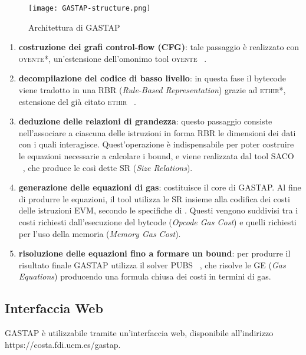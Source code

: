     \begin{figure}[h]
        \centering
        \texttt{[image: GASTAP-structure.png]}
        \caption[Struttura interna di GASTAP]{Architettura di GASTAP}
        \label{fig:gstp-struct}
    \end{figure}
    
    \begin{enumerate}
        \item \textbf{costruzione dei grafi control-flow (CFG)}: tale passaggio è realizzato con \textsc{oyente*}, un'estensione dell'omonimo tool \textsc{oyente} ~\cite{melonproject/oyente}.
        \item \textbf{decompilazione del codice di basso livello}: in questa fase il bytecode viene tradotto in una RBR (\textit{Rule-Based Representation}) grazie ad \textsc{ethir*}, estensione del già citato \textsc{ethir} ~\cite{albert2018ethir}.
        \item \textbf{deduzione delle relazioni di grandezza}: questo passaggio consiste nell'associare a ciascuna delle istruzioni in forma RBR le dimensioni dei dati con i quali interagisce. Quest'operazione è indispensabile per poter costruire le equazioni necessarie a calcolare i bound, e viene realizzata dal tool SACO ~\cite{10.1007/978-3-642-54862-8_46}, che produce le così dette SR (\textit{Size Relations}).
        \item \textbf{generazione delle equazioni di gas}: costituisce il core di GASTAP. Al fine di produrre le equazioni, il tool utilizza le SR insieme alla codifica dei costi delle istruzioni EVM, secondo le specifiche di \cite{wood2014ethereum}. Questi vengono suddivisi tra i costi richiesti dall'esecuzione del bytcode (\textit{Opcode Gas Cost}) e quelli richiesti per l'uso della memoria (\textit{Memory Gas Cost}). 
        \item \textbf{risoluzione delle equazioni fino a formare un bound}: per produrre il risultato finale GASTAP utilizza il solver PUBS ~\cite{albert2008automatic}, che risolve le GE (\textit{Gas Equations}) producendo una formula chiusa dei costi in termini di gas. 
    \end{enumerate}

    \subsection{Interfaccia Web}
    
    GASTAP è utilizzabile tramite un'interfaccia web, disponibile all'indirizzo \\
    https://costa.fdi.ucm.es/gastap.
    
